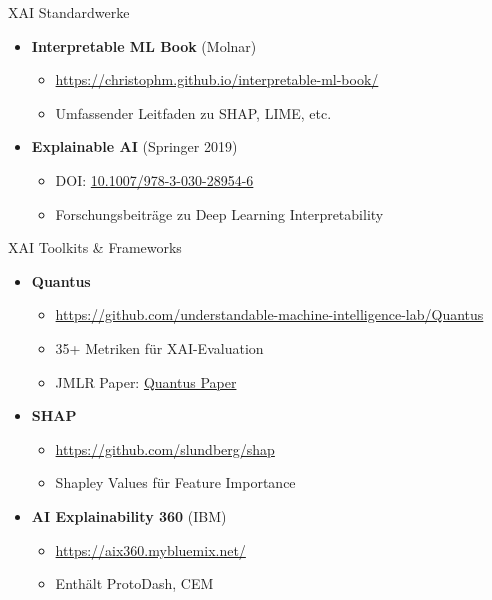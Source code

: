 \documentclass[aspectratio=1610, xcolor=dvipsnames, 9pt]{beamer}
\begin{document}
\begin{frame}{XAI Standardwerke}
  \begin{itemize}
    \item \textbf{Interpretable ML Book} (Molnar)
    \begin{itemize}
      \item \url{https://christophm.github.io/interpretable-ml-book/}
      \item Umfassender Leitfaden zu SHAP, LIME, etc.
    \end{itemize}
    \item \textbf{Explainable AI} (Springer 2019)
    \begin{itemize}
      \item DOI: \href{https://doi.org/10.1007/978-3-030-28954-6}{10.1007/978-3-030-28954-6}
      \item Forschungsbeiträge zu Deep Learning Interpretability
    \end{itemize}
  \end{itemize}
\end{frame}

\begin{frame}{XAI Toolkits \& Frameworks}
  \begin{itemize}
    \item \textbf{Quantus}
    \begin{itemize}
      \item \url{https://github.com/understandable-machine-intelligence-lab/Quantus}
      \item 35+ Metriken für XAI-Evaluation
      \item JMLR Paper: \href{https://www.jmlr.org/papers/v24/22-0142.html}{Quantus Paper}
    \end{itemize}
    \item \textbf{SHAP}
    \begin{itemize}
      \item \url{https://github.com/slundberg/shap}
      \item Shapley Values für Feature Importance
    \end{itemize}
    \item \textbf{AI Explainability 360} (IBM)
    \begin{itemize}
      \item \url{https://aix360.mybluemix.net/}
      \item Enthält ProtoDash, CEM
    \end{itemize}
  \end{itemize}
\end{frame}
\end{document}
